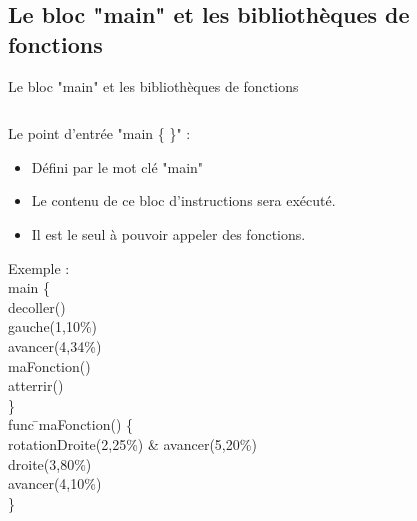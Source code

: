 \documentclass{bredelebeamer}
\begin{document}
\subsection{Le bloc "main" et les bibliothèques de fonctions} 
\begin{frame}{Le bloc "main" et les bibliothèques de fonctions} 

\begin{columns}

\begin{column}{0.5\textwidth}


Le point d'entrée "main \{ \}" :\\
\begin{itemize}
\item Défini par le mot clé "main"
\item Le contenu de ce bloc d'instructions sera exécuté.
\item Il est le seul à  pouvoir appeler des fonctions.
\end{itemize}\pause

\begin{tabbing}
Exemple :\=\\
	\>\color{Framarouge}main  \{\=\\ 
	\>\>\color{Framarouge}decoller()\\
	\>\>\color{Framarouge}gauche(\color{black}1\color{Framarouge},\color{Framagris}10\%\color{Framarouge})\\ 
	\>\>\color{Framarouge}avancer(\color{black}4\color{Framarouge},\color{Framagris}34\%\color{Framarouge})\\
	\>\>\color{Framarouge}maFonction()\\ 
	\>\>\color{Framarouge}atterrir()\\
	\>\color{Framarouge}\}\\
	
	\>\color{Framarouge}func \=\color{black}maFonction\color{Framarouge}() \{\\ 
	\>\>\color{Framarouge}rotationDroite(\color{black}2\color{Framarouge},\color{Framagris}25\%\color{Framarouge}) \& 
	\color{Framarouge}avancer(\color{black}5\color{Framarouge},\color{Framagris}20\%\color{Framarouge})\\ 
	\>\>\color{Framarouge}droite(\color{black}3\color{Framarouge},\color{Framagris}80\%\color{Framarouge})\\ 
	\>\>\color{Framarouge}avancer(\color{black}4\color{Framarouge},\color{Framagris}10\%\color{Framarouge})\\ 
	\>\color{Framarouge}\}\pause


\end{tabbing}
\end{column}
\end{columns}
\end{frame}
\end{document}
